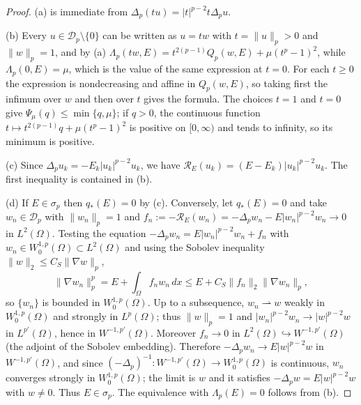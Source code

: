 \begin{proof}
(a) is immediate from $\Delta_p(tu)=|t|^{p-2}t\Delta_pu$.

(b) Every $u\in\mathcal D_p\setminus\{0\}$ can be written as $u=tw$ with $t=\|u\|_p>0$
and $\|w\|_p=1$, and by (a)
$\Lambda_p(tw,E)=t^{2(p-1)}Q_p(w,E)+\mu(t^p-1)^2$, while $\Lambda_p(0,E)=\mu$, which is
the value of the same expression at $t=0$. For each $t\ge0$ the expression is
nondecreasing and affine in $Q_p(w,E)$, so taking first the infimum over $w$ and then
over $t$ gives the formula. The choices $t=1$ and $t=0$ give
$\Psi_\mu(q)\le\min\{q,\mu\}$; if $q>0$, the continuous function
$t\mapsto t^{2(p-1)}q+\mu(t^p-1)^2$ is positive on $[0,\infty)$ and tends to infinity, so
its minimum is positive.

(c) Since $\Delta_pu_k=-E_k|u_k|^{p-2}u_k$, we have
$\mathcal R_E(u_k)=(E-E_k)|u_k|^{p-2}u_k$. The first inequality is contained in (b).

(d) If $E\in\sigma_p$ then $q_*(E)=0$ by (c). Conversely, let $q_*(E)=0$ and take
$w_n\in\mathcal D_p$ with $\|w_n\|_p=1$ and
$f_n:=-\mathcal R_E(w_n)=-\Delta_pw_n-E|w_n|^{p-2}w_n\to0$ in $L^2(\Omega)$. Testing the
equation $-\Delta_pw_n=E|w_n|^{p-2}w_n+f_n$ with $w_n\in W^{1,p}_0(\Omega)\subset
L^2(\Omega)$ and using the Sobolev inequality $\|w\|_2\le C_S\|\nabla w\|_p$,
\[
\|\nabla w_n\|_p^p=E+\int_\Omega f_nw_n\,dx\le E+C_S\|f_n\|_2\|\nabla w_n\|_p ,
\]
so $\{w_n\}$ is bounded in $W^{1,p}_0(\Omega)$. Up to a subsequence, $w_n\rightharpoonup w$
weakly in $W^{1,p}_0(\Omega)$ and strongly in $L^p(\Omega)$; thus $\|w\|_p=1$ and
$|w_n|^{p-2}w_n\to|w|^{p-2}w$ in $L^{p'}(\Omega)$, hence in $W^{-1,p'}(\Omega)$. Moreover
$f_n\to0$ in $L^2(\Omega)\hookrightarrow W^{-1,p'}(\Omega)$ (the adjoint of the Sobolev
embedding). Therefore $-\Delta_pw_n\to E|w|^{p-2}w$ in $W^{-1,p'}(\Omega)$, and since
$(-\Delta_p)^{-1}\colon W^{-1,p'}(\Omega)\to W^{1,p}_0(\Omega)$ is continuous,
$w_n$ converges strongly in $W^{1,p}_0(\Omega)$; the limit is $w$ and it satisfies
$-\Delta_pw=E|w|^{p-2}w$ with $w\neq0$. Thus $E\in\sigma_p$. The equivalence with
$\Lambda_p(E)=0$ follows from (b).
\end{proof}

